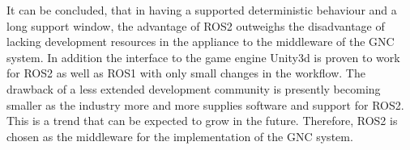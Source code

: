 It can be concluded, that in having a supported deterministic behaviour and a long support window, the advantage of ROS2 outweighs the disadvantage of lacking development resources in the appliance to the middleware of the \ac{GNC} system. In addition the interface to the game engine Unity3d is proven to work for ROS2 as well as ROS1 with only small changes in the workflow. The drawback of a less extended development community is presently becoming smaller as the industry more and more supplies software and support for ROS2. This is a trend that can be expected to grow in the future. Therefore, ROS2 is chosen as the middleware for the implementation of the \ac{GNC} system.



